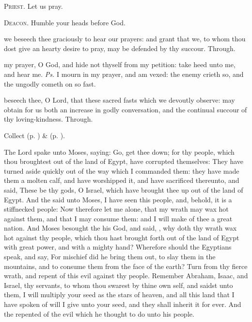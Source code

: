 \textsc{Priest.} Let us pray.\par
\textsc{Deacon.} Humble your heads before God.\par
{} we beseech thee graciously to hear our prayers: and grant that we, to whom thou dost give an hearty desire to pray, may be defended by thy succour. Through.


\clearpage
{}
\introit
{} my prayer, O God, and hide not thyself from my petition: take heed unto me, and hear me. \textit{Ps.} I mourn in my prayer, and am vexed: the enemy crieth so, and the ungodly cometh on so fast.

\collect
{} beseech thee, O Lord, that these sacred fasts which we devoutly observe: may obtain for us both an increase in godly conversation, and the continual succour of thy loving-kindness. Through.
\begin{rubric}
     Collect  (p. \pageref{AshWednesdayMassCollect}) \&   (p. \pageref{SPLivingDeparted}).
\end{rubric}


 The Lord spake unto Moses, saying: Go, get thee down; for thy people, which thou broughtest out of the land of Egypt, have corrupted themselves: They have turned aside quickly out of the way which I commanded them: they have made them a molten calf, and have worshipped it, and have sacrificed thereunto, and said, These be thy gods, O Israel, which have brought thee up out of the land of Egypt. And the  said unto Moses, I have seen this people, and, behold, it is a stiffnecked people: Now therefore let me alone, that my wrath may wax hot against them, and that I may consume them: and I will make of thee a great nation. And Moses besought the  his God, and said, , why doth thy wrath wax hot against thy people, which thou hast brought forth out of the land of Egypt with great power, and with a mighty hand? Wherefore should the Egyptians speak, and say, For mischief did he bring them out, to slay them in the mountains, and to consume them from the face of the earth? Turn from thy fierce wrath, and repent of this evil against thy people. Remember Abraham, Isaac, and Israel, thy servants, to whom thou swarest by thine own self, and saidst unto them, I will multiply your seed as the stars of heaven, and all this land that I have spoken of will I give unto your seed, and they shall inherit it for ever. And the  repented of the evil which he thought to do unto his people.

